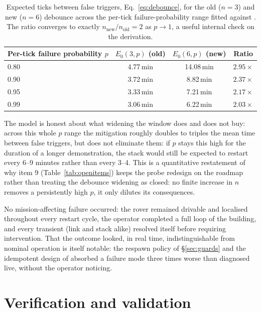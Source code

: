 \begin{table}[htbp]
\centering\small
\begin{tabular}{@{}lccc@{}}
\toprule
Per-tick failure probability $p$ & $E_0(3,p)$ (old) & $E_0(6,p)$ (new) & Ratio \\
\midrule
0.80 & 4.77\,min & 14.08\,min & $2.95\times$ \\
0.90 & 3.72\,min & 8.82\,min & $2.37\times$ \\
0.95 & 3.33\,min & 7.21\,min & $2.17\times$ \\
0.99 & 3.06\,min & 6.22\,min & $2.03\times$ \\
\bottomrule
\end{tabular}
\caption{Expected ticks between false triggers, Eq.~\eqref{eq:debounce}, for
the old ($n=3$) and new ($n=6$) debounce across the per-tick
failure-probability range fitted against . The ratio
converges to exactly $n_{\text{new}}/n_{\text{old}}=2$ as $p\to1$, a useful
internal check on the derivation.}
\label{tab:debounce-fit}
\end{table}

The model is honest about what widening the window does and does not buy:
across this whole $p$ range the mitigation roughly doubles to triples the
mean time between false triggers, but does not eliminate them: if $p$
stays this high for the duration of a longer demonstration, the stack would
still be expected to restart every 6--9 minutes rather than every 3--4.
This is a quantitative restatement of why item 9
(Table~\ref{tab:openitems}) keeps the probe redesign on the roadmap rather
than treating the debounce widening as closed: no finite increase in $n$
removes a persistently high $p$, it only dilutes its consequences.

No mission-affecting failure occurred: the rover remained drivable and
localised throughout every restart cycle, the operator completed a full
loop of the building, and every transient (link and stack alike)
resolved itself before requiring intervention. That the outcome looked, in
real time, indistinguishable from nominal operation is itself notable: the
respawn policy of \S\ref{sec:guards} and the idempotent design of
 absorbed a failure mode three times worse than
diagnosed live, without the operator noticing.

\section{Verification and validation}
\label{sec:vv}

